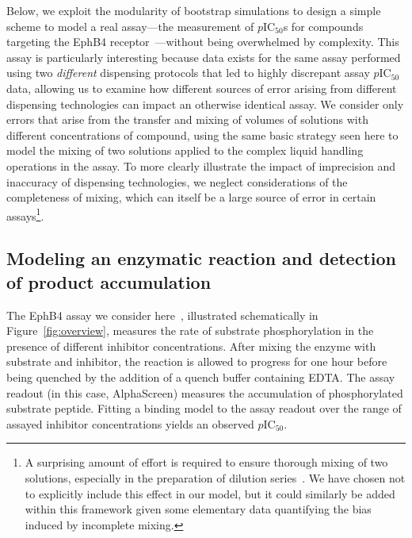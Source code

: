 \documentclass[aps,pre,twocolumn,nofootinbib,superscriptaddress,linenumbers]{revtex4-1}
\begin{document}
Below, we exploit the modularity of bootstrap simulations to design a simple scheme to model a real assay---the measurement of $p$IC$_{50}$s for compounds targeting the EphB4 receptor~\cite{ekins_dispensing_2013,barlaam_novel_2009,barlaam_pyrimidine_2010}---without being overwhelmed by complexity.
This assay is particularly interesting because data exists for the same assay performed using two \emph{different} dispensing protocols that led to highly discrepant assay $p$IC$_{50}$ data, allowing us to examine how different sources of error arising from different dispensing technologies can impact an otherwise identical assay.
We consider only errors that arise from the transfer and mixing of volumes of solutions with different concentrations of compound, using the same basic strategy seen here to model the mixing of two solutions applied to the complex liquid handling operations in the assay.
To more clearly illustrate the impact of imprecision and inaccuracy of dispensing technologies, we neglect considerations of the completeness of mixing, which can itself be a large source of error in certain assays\footnote{A surprising amount of effort is required to ensure thorough mixing of two solutions, especially in the preparation of dilution series~\cite{walling_mixing_2007,weiss_modeling_2002,mitre_turbo-mixing_2007}. We have chosen not to explicitly include this effect in our model, but it could similarly be added within this framework given some elementary data quantifying the bias induced by incomplete mixing.}.

\subsection*{Modeling an enzymatic reaction and detection of product accumulation}

The EphB4 assay we consider here~\cite{ekins_dispensing_2013,barlaam_novel_2009,barlaam_pyrimidine_2010}, illustrated schematically in Figure~\ref{fig:overview}, measures the rate of substrate phosphorylation in the presence of different inhibitor concentrations.
After mixing the enzyme with substrate and inhibitor, the reaction is allowed to progress for one hour before being quenched by the addition of a quench buffer containing EDTA.
The assay readout (in this case, AlphaScreen) measures the accumulation of phosphorylated substrate peptide.
Fitting a binding model to the assay readout over the range of assayed inhibitor concentrations yields an observed $p$IC$_{50}$.
\end{document}
